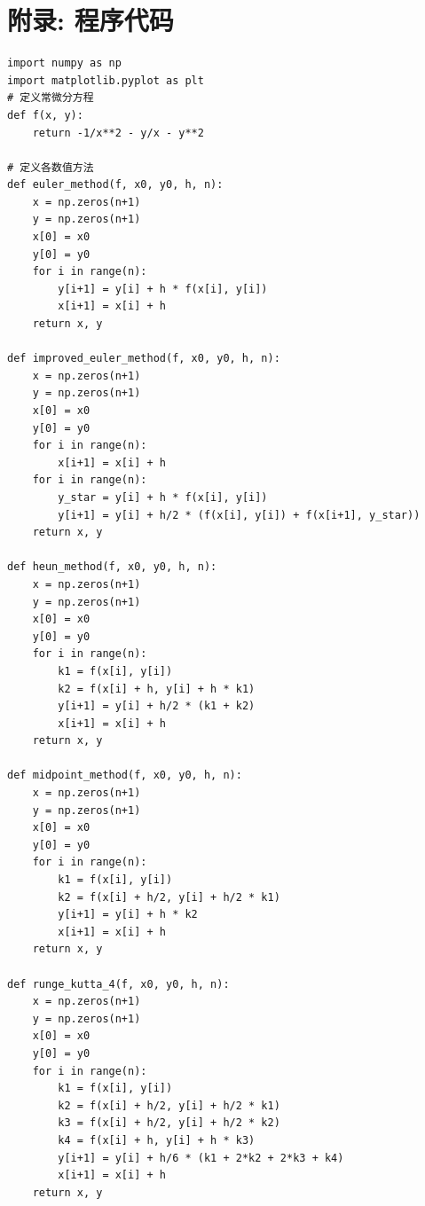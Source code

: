 \documentclass[UTF8,ctexart,a4paper,11pt,openany]{article}
\theoremstyle{definition}
\begin{document}
\section{附录: 程序代码}

\begin{lstlisting}[aboveskip=0pt]
import numpy as np
import matplotlib.pyplot as plt
# 定义常微分方程
def f(x, y):
    return -1/x**2 - y/x - y**2

# 定义各数值方法
def euler_method(f, x0, y0, h, n):
    x = np.zeros(n+1)
    y = np.zeros(n+1)
    x[0] = x0
    y[0] = y0
    for i in range(n):
        y[i+1] = y[i] + h * f(x[i], y[i])
        x[i+1] = x[i] + h
    return x, y

def improved_euler_method(f, x0, y0, h, n):
    x = np.zeros(n+1)
    y = np.zeros(n+1)
    x[0] = x0
    y[0] = y0
    for i in range(n):
        x[i+1] = x[i] + h
    for i in range(n):
        y_star = y[i] + h * f(x[i], y[i])
        y[i+1] = y[i] + h/2 * (f(x[i], y[i]) + f(x[i+1], y_star))
    return x, y

def heun_method(f, x0, y0, h, n):
    x = np.zeros(n+1)
    y = np.zeros(n+1)
    x[0] = x0
    y[0] = y0
    for i in range(n):
        k1 = f(x[i], y[i])
        k2 = f(x[i] + h, y[i] + h * k1)
        y[i+1] = y[i] + h/2 * (k1 + k2)
        x[i+1] = x[i] + h
    return x, y

def midpoint_method(f, x0, y0, h, n):
    x = np.zeros(n+1)
    y = np.zeros(n+1)
    x[0] = x0
    y[0] = y0
    for i in range(n):
        k1 = f(x[i], y[i])
        k2 = f(x[i] + h/2, y[i] + h/2 * k1)
        y[i+1] = y[i] + h * k2
        x[i+1] = x[i] + h
    return x, y

def runge_kutta_4(f, x0, y0, h, n):
    x = np.zeros(n+1)
    y = np.zeros(n+1)
    x[0] = x0
    y[0] = y0
    for i in range(n):
        k1 = f(x[i], y[i])
        k2 = f(x[i] + h/2, y[i] + h/2 * k1)
        k3 = f(x[i] + h/2, y[i] + h/2 * k2)
        k4 = f(x[i] + h, y[i] + h * k3)
        y[i+1] = y[i] + h/6 * (k1 + 2*k2 + 2*k3 + k4)
        x[i+1] = x[i] + h
    return x, y


\end{lstlisting}
\end{document}

